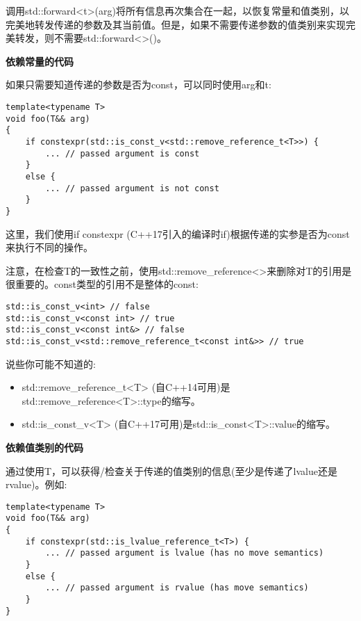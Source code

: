 调用std::forward<t>(arg)将所有信息再次集合在一起，以恢复常量和值类别，以完美地转发传递的参数及其当前值。但是，如果不需要传递参数的值类别来实现完美转发，则不需要std::forward<>()。\par

\hspace*{\fill} \par %
\textbf{依赖常量的代码}

如果只需要知道传递的参数是否为const，可以同时使用arg和t:\par

\begin{lstlisting}[caption={}]
template<typename T>
void foo(T&& arg)
{
	if constexpr(std::is_const_v<std::remove_reference_t<T>>) {
		... // passed argument is const
	}
	else {
		... // passed argument is not const
	}
}
\end{lstlisting}

这里，我们使用if constexpr (C++17引入的编译时if)根据传递的实参是否为const来执行不同的操作。\par

注意，在检查T的一致性之前，使用std::remove\_reference<>来删除对T的引用是很重要的。const类型的引用不是整体的const:\par

\begin{lstlisting}[caption={}]
std::is_const_v<int> // false
std::is_const_v<const int> // true
std::is_const_v<const int&> // false
std::is_const_v<std::remove_reference_t<const int&>> // true
\end{lstlisting}

说些你可能不知道的:\par

\begin{itemize}
	\item std::remove\_reference\_t<T> (自C++14可用)是std::remove\_reference<T>::type的缩写。
	\item std::is\_const\_v<T> (自C++17可用)是std::is\_const<T>::value的缩写。
\end{itemize}

\hspace*{\fill} \par %
\textbf{依赖值类别的代码}

通过使用T，可以获得/检查关于传递的值类别的信息(至少是传递了lvalue还是rvalue)。例如:\par

\begin{lstlisting}[caption={}]
template<typename T>
void foo(T&& arg)
{
	if constexpr(std::is_lvalue_reference_t<T>) {
		... // passed argument is lvalue (has no move semantics)
	}
	else {
		... // passed argument is rvalue (has move semantics)
	}
}
\end{lstlisting}

